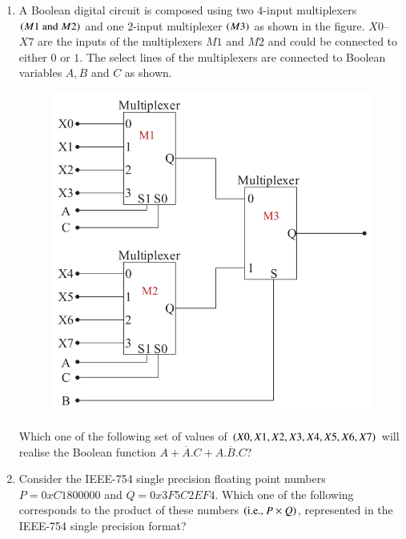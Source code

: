 \documentclass[journal,12pt,onecolumn]{IEEEtran}
\theoremstyle{remark}
\begin{document}
\begin{enumerate}
		\item A Boolean digital circuit is composed using two $4$-input multiplexers $\left(M1 \text{ and } M2\right)$ and one $2$-input multiplexer $\left(M3\right)$ as shown in the figure. $X0$–$X7$ are the inputs of the multiplexers $M1$ and $M2$ and could be connected to either $0$ or $1$. The select lines of the multiplexers are connected to Boolean variables $A, B$ and $C$ as shown.
		\begin{figure}[H]
			\centering
			\includegraphics[width=0.5\linewidth]{figs/screenshot017}
			\caption{}
			\label{fig:screenshot017}
		\end{figure}
		

		
		Which one of the following set of values of $\left(X0, X1, X2, X3, X4, X5, X6, X7\right)$ will realise the Boolean function $A + \overline{A}.C + A.\overline{
		B}.C$?
		
		\hfill{}
		
		\begin{enumerate}
		\end{enumerate}
		
		\item Consider the IEEE-754 single precision floating point numbers
		$P=0xC1800000$ and $Q=0x3F5C2EF4$.
		Which one of the following corresponds to the product of these numbers $\left(\text{i.e., } P \times Q\right)$, represented in the IEEE-754 single precision format?
		

\end{enumerate}
\end{document}
